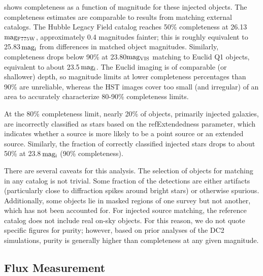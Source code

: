  shows completeness as a function of magnitude for these injected objects. The completeness estimates are comparable to results from matching external catalogs. The Hubble Legacy Field catalog \citep{2019ApJS..244...16W,2016arXiv160600841I} reaches 50\% completeness at 26.13\,${\rm mag_{F775W}}$, approximately 0.4 magnitudes fainter; this is roughly equivalent to 25.83\,${\rm mag_{i}}$ from differences in matched object magnitudes. Similarly, completeness drops below 90\% at 23.80${\rm mag_{VIS}}$ matching to Euclid Q1 \citep{2025arXiv250315305E} objects, equivalent to about 23.5\,${\rm mag_{i}}$. The Euclid imaging is of comparable (or shallower) depth, so magnitude limits at lower completeness percentages than 90\% are unreliable, whereas the HST images cover too small (and irregular) of an area to accurately characterize 80-90\% completeness limits.

At the 80\% completeness limit, nearly 20\% of objects, primarily injected galaxies, are incorrectly classified as stars based on the refExtendedness parameter, which indicates whether a source is more likely to be a point source or an extended source.
Similarly, the fraction of correctly classified injected stars drops to about 50\% at 23.8\,${\rm mag_{i}}$ (90\% completeness).

There are several caveats for this analysis. The selection of objects for matching in any catalog is not trivial. Some fraction of the detections are either artifacts (particularly close to diffraction spikes around bright stars) or otherwise spurious. Additionally, some objects lie in masked regions of one survey but not another, which has not been accounted for. For injected source matching, the reference catalog does not include real on-sky objects. For this reason, we do not quote specific figures for purity; however, based on prior analyses of the \gls{DC2} simulations, purity is generally higher than completeness at any given magnitude.

\subsection{Flux Measurement}
\label{ssec:fluxes}

